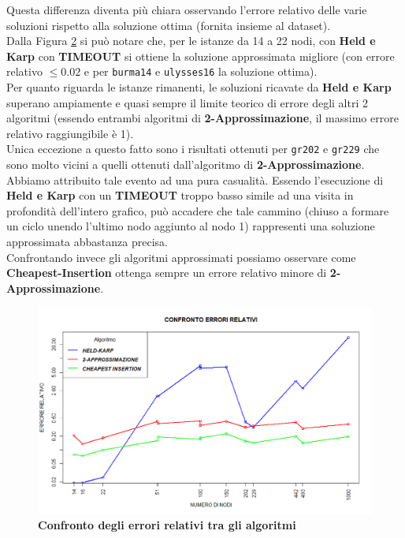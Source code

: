 \documentclass[]{article}
\begin{document}
\begin{flushleft}
\begin{figure}[H]
	\label{total}
\end{figure}
Questa differenza diventa più chiara osservando l'errore relativo delle varie soluzioni rispetto alla soluzione ottima (fornita insieme al dataset).\\
Dalla Figura \ref{conf_tot} si può notare che, per le istanze da 14 a 22 nodi, con \textbf{Held e Karp} con \textbf{TIMEOUT} si ottiene la soluzione approssimata migliore (con errore relativo $\leq 0.02$ e per \verb|burma14| e \verb|ulysses16| la soluzione ottima).\\
Per quanto riguarda le istanze rimanenti, le soluzioni ricavate da \textbf{Held e Karp} superano ampiamente e quasi sempre il limite teorico di errore degli altri 2 algoritmi (essendo entrambi algoritmi di \textbf{2-Approssimazione}, il massimo errore relativo raggiungibile è 1).\\
Unica eccezione a questo fatto sono i risultati ottenuti per \verb|gr202| e \verb|gr229| che sono molto vicini a quelli ottenuti dall'algoritmo di \textbf{2-Approssimazione}.\\
Abbiamo attribuito tale evento ad una pura casualità. Essendo l'esecuzione di \textbf{Held e Karp} con un \textbf{TIMEOUT} troppo basso simile ad una visita in profondità dell'intero grafico, può accadere che tale cammino (chiuso a formare un ciclo unendo l'ultimo nodo aggiunto al nodo 1) rappresenti una soluzione approssimata abbastanza precisa.\\
\medskip
Confrontando invece gli algoritmi approssimati possiamo osservare come \textbf{Cheapest-Insertion} ottenga sempre un errore relativo minore di \textbf{2-Approssimazione}.
\begin{figure}[h]
	\centering
	\includegraphics[width=\textwidth,height=\textheight,keepaspectratio]{CONFRONTO_ERRORI_RELATIVI_20_MIN_NEW.png}
	\caption{\textbf{Confronto degli errori relativi tra gli algoritmi}}
	\label{conf_tot}
\end{figure}
\newpage

\end{flushleft}
\end{document}
